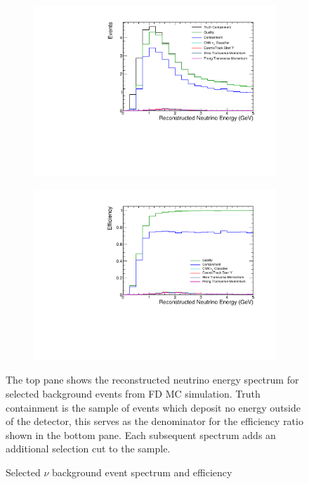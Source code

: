 \begin{figure}
\vspace{-30pt}
\begin{center}
  \begin{subfigure}[b]{0.7\textwidth}
    \centering
    \includegraphics[width=\textwidth]{figures/selection/myflow_bkg_osc.pdf}
  \end{subfigure}

  \begin{subfigure}[b]{0.7\textwidth}
    \centering
    \includegraphics[width=\textwidth]{figures/selection/myflow_bkg_eff_osc.pdf}
  \end{subfigure}

\end{center}
\vspace{-10pt}
\caption{Selected $\nu$ background event spectrum and efficiency}{
The top pane shows the reconstructed neutrino energy spectrum
for selected background events from FD MC simulation.
Truth containment is the sample of events which deposit
no energy outside of the detector, this serves as the denominator
for the efficiency ratio shown in the bottom pane.
Each subsequent spectrum adds an additional selection cut to the sample.
}
\label{cut_flow_bkg}
\end{figure}

